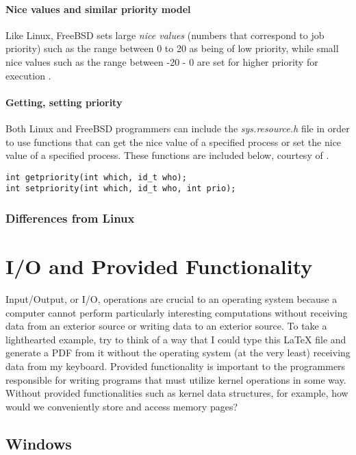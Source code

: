 \documentclass[letterpaper,10pt,titlepage]{article}
\begin{document}
\paragraph{Nice values and similar priority model} Like Linux, FreeBSD sets large \emph{nice values} (numbers that correspond to job priority) such as the range between 0 to 20 as being of low priority, while small nice values such as the range between -20 - 0 are set for higher priority for execution \cite{boe01}. 
\paragraph{Getting, setting priority} Both Linux and FreeBSD programmers can include the \emph{sys.resource.h} file in order to use functions that can get the nice value of a specified process or set the nice value of a specified process. These functions are included below, courtesy of \cite{ker10}. 
\begin{lstlisting}
int getpriority(int which, id_t who);
int setpriority(int which, id_t who, int prio);
\end{lstlisting}

\subsubsection{Differences from Linux}

% 
%
%

\section{I/O and Provided Functionality}
Input/Output, or I/O, operations are crucial to an operating system because a computer cannot perform particularly interesting computations without receiving data from an exterior source or writing data to an exterior source. To take a lighthearted example, try to think of a way that I could type this LaTeX file and generate a PDF from it without the operating system (at the very least) receiving data from my keyboard. Provided functionality is important to the programmers responsible for writing programs that must utilize kernel operations in some way. Without provided functionalities such as kernel data structures, for example, how would we conveniently store and access memory pages? 

\subsection{Windows}
\end{document}

